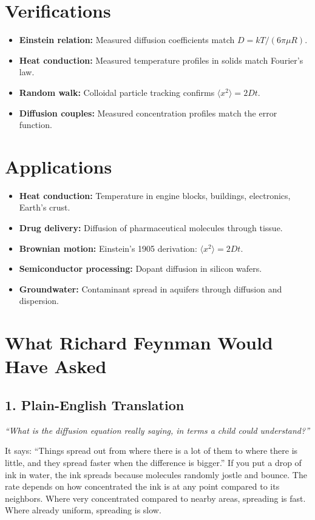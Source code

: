 \documentclass[11pt,openright]{book}
\begin{document}
\section*{Verifications}

\begin{itemize}
\item \textbf{Einstein relation:} Measured diffusion coefficients match $D = kT/(6\pi\mu R)$.
\item \textbf{Heat conduction:} Measured temperature profiles in solids match Fourier's law.
\item \textbf{Random walk:} Colloidal particle tracking confirms $\langle x^2 \rangle = 2Dt$.
\item \textbf{Diffusion couples:} Measured concentration profiles match the error function.
\end{itemize}
\section*{Applications}

\begin{itemize}
\item \textbf{Heat conduction:} Temperature in engine blocks, buildings, electronics, Earth's crust.
\item \textbf{Drug delivery:} Diffusion of pharmaceutical molecules through tissue.
\item \textbf{Brownian motion:} Einstein's 1905 derivation: $\langle x^2 \rangle = 2Dt$.
\item \textbf{Semiconductor processing:} Dopant diffusion in silicon wafers.
\item \textbf{Groundwater:} Contaminant spread in aquifers through diffusion and dispersion.
\end{itemize}
\section*{What Richard Feynman Would Have Asked}

\subsection*{1. Plain-English Translation}
\textit{``What is the diffusion equation really saying, in terms a child could understand?''}

It says: ``Things spread out from where there is a lot of them to where there is little, and they spread faster when the difference is bigger.'' If you put a drop of ink in water, the ink spreads because molecules randomly jostle and bounce. The rate depends on how concentrated the ink is at any point compared to its neighbors. Where very concentrated compared to nearby areas, spreading is fast. Where already uniform, spreading is slow.
\end{document}
